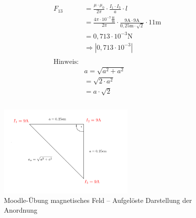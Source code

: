 \begin{enumerate}
        \begin{align*}
          F_{13} & =\frac{\mu\cdot\mu_{0}}{2\pi}\cdot\frac{I_{1}\cdot I_{3}}{a}\cdot l                                                                     \\
                 & =\frac{4\pi\cdot 10^{-7}\frac{\text{H}}{\text{m}}}{2\pi}\cdot\frac{9\text{A}\cdot 9\text{A}}{0,25\text{m}\cdot\sqrt{2}}\cdot 11\text{m} \\
                 & = 0,713\cdot 10^{-3}\text{N}                                                                                                            \\
                 & \Rightarrow |0,713\cdot 10^{-3}|                                                                                                        \\
          \\
          \text{Hinweis:}                                                                                                                                  \\
                 & a=\sqrt{a^2+a^2}                                                                                                                        \\
                 & =\sqrt{2\cdot a^2}                                                                                                                      \\
                 & = a\cdot\sqrt{2}                                                                                                                        \\                                                                                       \\
        \end{align*}

        \begin{figure}[!h]
          \begin{center}
            \includegraphics[width=0.6\textwidth]{img/Magnetisches-Feld/A2.1.png}
          \end{center}
          \caption{Moodle-Übung magnetisches Feld – Aufgelöste Darstellung der Anordnung}
        \end{figure}
        \newpage


\end{enumerate}
